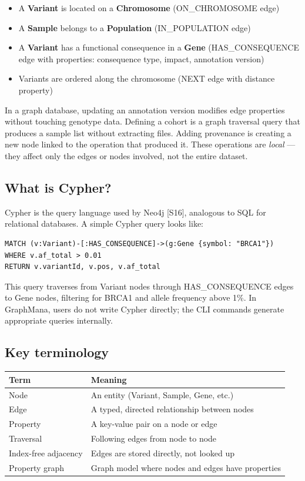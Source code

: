 \documentclass[11pt,a4paper]{article}
\begin{document}
\begin{itemize}
\item A \textbf{Variant} is located on a \textbf{Chromosome} (ON\_CHROMOSOME edge)
\item A \textbf{Sample} belongs to a \textbf{Population} (IN\_POPULATION edge)
\item A \textbf{Variant} has a functional consequence in a \textbf{Gene} (HAS\_CONSEQUENCE edge with properties: consequence type, impact, annotation version)
\item Variants are ordered along the chromosome (NEXT edge with distance property)
\end{itemize}

In a graph database, updating an annotation version modifies edge properties without touching genotype data. Defining a cohort is a graph traversal query that produces a sample list without extracting files. Adding provenance is creating a new node linked to the operation that produced it. These operations are \textit{local} --- they affect only the edges or nodes involved, not the entire dataset.

\subsection*{What is Cypher?}

Cypher is the query language used by Neo4j [S16], analogous to SQL for relational databases. A simple Cypher query looks like:

\begin{lstlisting}
MATCH (v:Variant)-[:HAS_CONSEQUENCE]->(g:Gene {symbol: "BRCA1"})
WHERE v.af_total > 0.01
RETURN v.variantId, v.pos, v.af_total
\end{lstlisting}

This query traverses from Variant nodes through HAS\_CONSEQUENCE edges to Gene nodes, filtering for BRCA1 and allele frequency above 1\%. In GraphMana, users do not write Cypher directly; the CLI commands generate appropriate queries internally.

\subsection*{Key terminology}

\begin{tabular}{ll}
\toprule
Term & Meaning \\
\midrule
Node & An entity (Variant, Sample, Gene, etc.) \\
Edge & A typed, directed relationship between nodes \\
Property & A key-value pair on a node or edge \\
Traversal & Following edges from node to node \\
Index-free adjacency & Edges are stored directly, not looked up \\
Property graph & Graph model where nodes and edges have properties \\
\bottomrule
\end{tabular}
\end{document}
